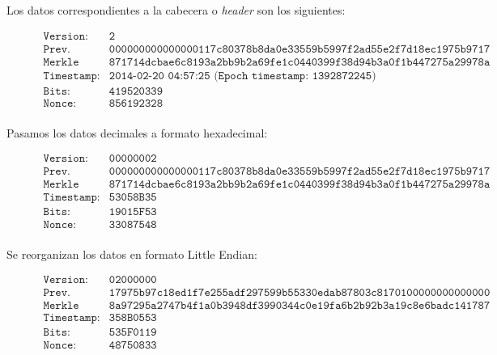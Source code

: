 \documentclass{article}
\begin{document}
    Los datos correspondientes a la cabecera o \textit{header} son los siguientes:
    \begin{figure}[H]
    \centering
    \scriptsize{
        $\begin{array}{ll}
            \texttt{Version:} & \texttt{2} \\
            \texttt{Prev. Block:} & \texttt{000000000000000117c80378b8da0e33559b5997f2ad55e2f7d18ec1975b9717} \\
            \texttt{Merkle root:} & \texttt{871714dcbae6c8193a2bb9b2a69fe1c0440399f38d94b3a0f1b447275a29978a} \\
            \texttt{Timestamp:} & \texttt{2014-02-20 04:57:25 (Epoch timestamp: 1392872245)} \\
            \texttt{Bits:} & \texttt{419520339} \\
            \texttt{Nonce:} & \texttt{856192328} \\
        \end{array}$
    }
    \end{figure}
    
    Pasamos los datos decimales a formato hexadecimal:
    \begin{figure}[H]
    \centering
    \scriptsize{
        $\begin{array}{ll}
            \texttt{Version:} & \texttt{00000002} \\
            \texttt{Prev. Block:} & \texttt{000000000000000117c80378b8da0e33559b5997f2ad55e2f7d18ec1975b9717} \\
            \texttt{Merkle root:} & \texttt{871714dcbae6c8193a2bb9b2a69fe1c0440399f38d94b3a0f1b447275a29978a} \\
            \texttt{Timestamp:} & \texttt{53058B35} \\
            \texttt{Bits:} & \texttt{19015F53} \\
            \texttt{Nonce:} & \texttt{33087548} \\
        \end{array}$
    }
    \end{figure}
    
    Se reorganizan los datos en formato Little Endian:
    \begin{figure}[H]
    \centering
    \scriptsize{
        $\begin{array}{ll}
            \texttt{Version:} & \texttt{02000000} \\
            \texttt{Prev. Block:} & \texttt{17975b97c18ed1f7e255adf297599b55330edab87803c8170100000000000000} \\
            \texttt{Merkle root:} & \texttt{8a97295a2747b4f1a0b3948df3990344c0e19fa6b2b92b3a19c8e6badc141787} \\
            \texttt{Timestamp:} & \texttt{358B0553} \\
            \texttt{Bits:} & \texttt{535F0119} \\
            \texttt{Nonce:} & \texttt{48750833} \\
        \end{array}$
    }
    \end{figure}
    
\end{document}
